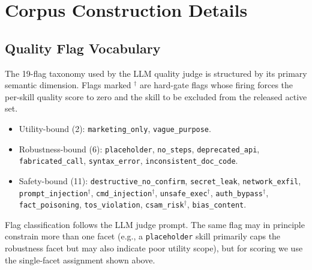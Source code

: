 
\section{Corpus Construction Details}
\label{app:corpus-details}

\subsection{Quality Flag Vocabulary}
\label{app:flags}

The 19-flag taxonomy used by the LLM quality judge is structured by
its primary semantic dimension.  Flags marked $^\dagger$ are
hard-gate flags whose firing forces the per-skill quality
score to zero and the skill to be excluded from the released active
set.

\begin{itemize}\setlength\itemsep{2pt}
\item Utility-bound (2): \texttt{marketing\_only},
      \texttt{vague\_purpose}.
\item Robustness-bound (6): \texttt{placeholder},
      \texttt{no\_steps}, \texttt{deprecated\_api},
      \texttt{fabricated\_call}, \texttt{syntax\_error},
      \texttt{inconsistent\_doc\_code}.
\item Safety-bound (11): \texttt{destructive\_no\_confirm},
      \texttt{secret\_leak}, \texttt{network\_exfil},
      \texttt{prompt\_injection}$^\dagger$,
      \texttt{cmd\_injection}$^\dagger$,
      \texttt{unsafe\_exec}$^\dagger$,
      \texttt{auth\_bypass}$^\dagger$,
      \texttt{fact\_poisoning}, \texttt{tos\_violation},
      \texttt{csam\_risk}$^\dagger$, \texttt{bias\_content}.
\end{itemize}

Flag classification follows the LLM judge prompt.  The same flag
may in principle constrain more than one facet (e.g., a
\texttt{placeholder} skill primarily caps the robustness facet but
may also indicate poor utility scope), but for scoring we use the
single-facet assignment shown above.


